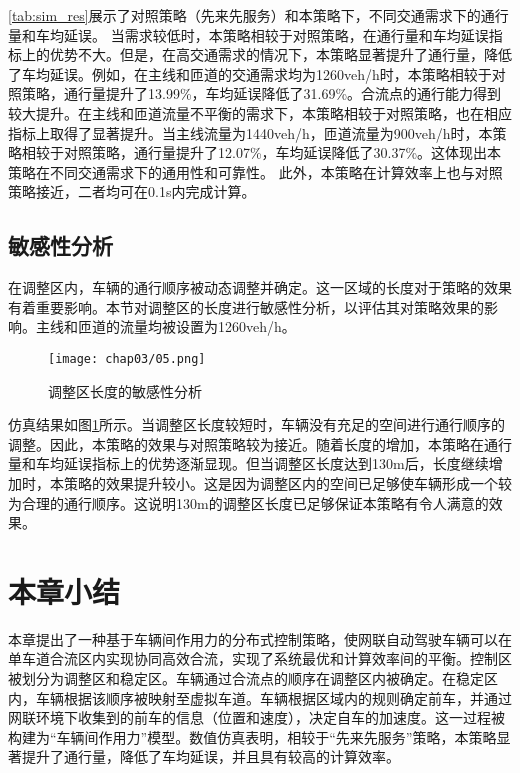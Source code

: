 \ref{tab:sim_res}展示了对照策略（先来先服务）和本策略下，不同交通需求下的通行量和车均延误。
当需求较低时，本策略相较于对照策略，在通行量和车均延误指标上的优势不大。但是，在高交通需求的情况下，本策略显著提升了通行量，降低了车均延误。例如，在主线和匝道的交通需求均为1260veh/h时，本策略相较于对照策略，通行量提升了13.99\%，车均延误降低了31.69\%。合流点的通行能力得到较大提升。在主线和匝道流量不平衡的需求下，本策略相较于对照策略，也在相应指标上取得了显著提升。当主线流量为1440veh/h，匝道流量为900veh/h时，本策略相较于对照策略，通行量提升了12.07\%，车均延误降低了30.37\%。这体现出本策略在不同交通需求下的通用性和可靠性。
此外，本策略在计算效率上也与对照策略接近，二者均可在0.1s内完成计算。
\subsection{敏感性分析}
在调整区内，车辆的通行顺序被动态调整并确定。这一区域的长度对于策略的效果有着重要影响。本节对调整区的长度进行敏感性分析，以评估其对策略效果的影响。主线和匝道的流量均被设置为1260veh/h。
\begin{figure}[htbp]
    \centering
    \texttt{[image: chap03/05.png]}
    \caption{调整区长度的敏感性分析}
    \label{fig:sensitivity}
\end{figure}
仿真结果如图\ref{fig:sensitivity}所示。当调整区长度较短时，车辆没有充足的空间进行通行顺序的调整。因此，本策略的效果与对照策略较为接近。随着长度的增加，本策略在通行量和车均延误指标上的优势逐渐显现。但当调整区长度达到130m后，长度继续增加时，本策略的效果提升较小。这是因为调整区内的空间已足够使车辆形成一个较为合理的通行顺序。这说明130m的调整区长度已足够保证本策略有令人满意的效果。

\section{本章小结}
本章提出了一种基于车辆间作用力的分布式控制策略，使网联自动驾驶车辆可以在单车道合流区内实现协同高效合流，实现了系统最优和计算效率间的平衡。控制区被划分为调整区和稳定区。车辆通过合流点的顺序在调整区内被确定。在稳定区内，车辆根据该顺序被映射至虚拟车道。车辆根据区域内的规则确定前车，并通过网联环境下收集到的前车的信息（位置和速度），决定自车的加速度。这一过程被构建为“车辆间作用力”模型。数值仿真表明，相较于“先来先服务”策略，本策略显著提升了通行量，降低了车均延误，并且具有较高的计算效率。
